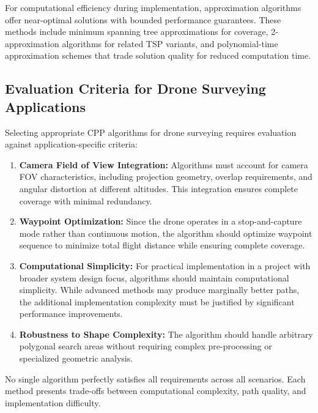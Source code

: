For computational efficiency during implementation, approximation algorithms offer near-optimal solutions with bounded performance guarantees. These methods include minimum spanning tree approximations for coverage, 2-approximation algorithms for related TSP variants, and polynomial-time approximation schemes that trade solution quality for reduced computation time.


\subsection{Evaluation Criteria for Drone Surveying Applications}

Selecting appropriate CPP algorithms for drone surveying requires evaluation against application-specific criteria:
\begin{enumerate}
    \item \textbf{Camera Field of View Integration:} Algorithms must account for camera FOV characteristics, including projection geometry, overlap requirements, and angular distortion at different altitudes. This integration ensures complete coverage with minimal redundancy.
    \item \textbf{Waypoint Optimization:} Since the drone operates in a stop-and-capture mode rather than continuous motion, the algorithm should optimize waypoint sequence to minimize total flight distance while ensuring complete coverage.
    \item \textbf{Computational Simplicity:} For practical implementation in a project with broader system design focus, algorithms should maintain computational simplicity. While advanced methods may produce marginally better paths, the additional implementation complexity must be justified by significant performance improvements.
    \item \textbf{Robustness to Shape Complexity:} The algorithm should handle arbitrary polygonal search areas without requiring complex pre-processing or specialized geometric analysis.
\end{enumerate}

No single algorithm perfectly satisfies all requirements across all scenarios. Each method presents trade-offs between computational complexity, path quality, and implementation difficulty.

